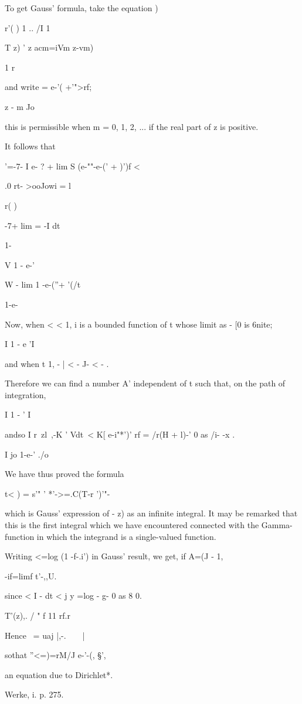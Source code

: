 %
%

To get Gauss' formula, take the equation )

r'( ) 1 .. /I 1 \

T z) ' z acm=iVm z-vm)

1 r

and write = e-'( +'">rf;

z - m Jo

this is permissible when m = 0, 1, 2, ... if the real part of z is
positive.

It follows that

 '=-7- I e- ? + lim S (e-""-e-(' + )')f <

.0 rt- >ooJowi = l

r( )

-7+ lim = -I dt

1-

V 1 - e-'

W - lim 1 -e-(''+ '(/t

1-e-

Now, when < < 1, i is a bounded function of t whose limit as - [0 is
6nite;

I 1 - e 'I

and when t 1, - | < - J- < - .

Therefore we can find a number A' independent of t such that, on the
path of integration,

I 1 - ' I

andso I r\ zl~,-K ' Vdt\ < K[ e-i"*')' rf = /r(H + l)-' 0 as /i- -x .

I jo 1-e-' ./o

We have thus proved the formula

t< ) = s'" ' *'->=.C(T-r ')'"-

which is Gauss' expression of - z) as an infinite integral. It may be
remarked that this is the first integral which we have encountered
connected with the Gamma-function in which the integrand is a
single-valued function.

Writing <=log (1 -f-.i') in Gauss' result, we get, if A=(J - 1,

 -if=limf t'-,,U.

since < I - dt < j y =log - g- 0 as 8 0.

T'(z),. / " f 11 rf.r

Hence \ = uaj |,-.\ \ \ \ |\,

sothat ''<=)=rM/J e-'-(, §',

an equation due to Dirichlet*.

Werke, i. p. 275.

